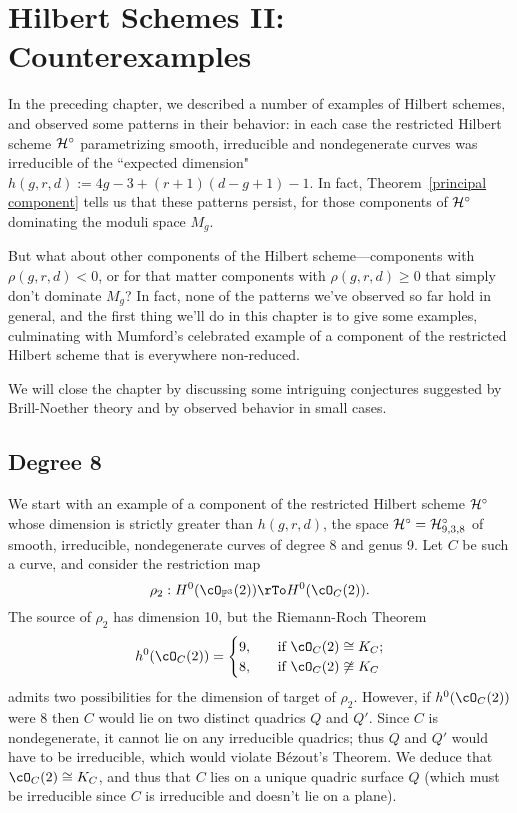 
\chapter{Hilbert Schemes II: Counterexamples} 
\label{HilbertSchemesCounterexamplesChapter}


In the preceding chapter, we described a number of examples of Hilbert schemes, and observed some patterns in their behavior: in each case the restricted Hilbert scheme $\cH^\circ$ parametrizing smooth, irreducible and nondegenerate curves was irreducible of the ``expected dimension" $h(g,r,d) :=  4g-3 + (r+1)(d-g+1) - 1$. In fact, Theorem~\ref{principal component} tells us that these patterns persist, for those components of $\cH^\circ$ dominating the moduli space $M_g$.

But what about other components of the Hilbert scheme---components with $\rho(g,r,d) < 0$, or for that matter components with $\rho(g,r,d) \geq 0$ that simply don't dominate $M_g$? In fact, none of the patterns we've observed so far hold in general, and the first thing we'll do in this chapter is to give some examples, culminating with Mumford's celebrated example of a component of the restricted Hilbert scheme that is everywhere non-reduced.

We will close the chapter by discussing some intriguing conjectures suggested by Brill-Noether theory and by observed behavior in small cases.


\section{Degree 8}\label{degree 8 section}

We start with an example of a component of the restricted Hilbert scheme $\cH^\circ$ whose dimension is strictly greater than $h(g,r,d)$, the space $\cH^\circ = \cH^\circ_{9,3,8}$ of smooth, irreducible, nondegenerate curves of degree 8 and genus 9. Let $C$ be such a curve, and consider the restriction map
$$
\rho_2 : H^0(\cO_{\PP^3}(2)) \rTo H^0(\cO_C(2)).
$$
The source of $\rho_2$ has dimension 10, but the Riemann-Roch Theorem
\begin{align*}
h^0(\cO_C(2)) =
\begin{cases}
9, \quad &\text{if } \cO_C(2) \cong K_C; \\
8,  \quad &\text{if } \cO_C(2) \not\cong K_C
\end{cases}
\end{align*}
admits two possibilities for the dimension of target of $\rho_2$.
However, if $h^0(\cO_C(2))$ were 8 then $C$ would  lie on two distinct quadrics $Q$ and $Q'$. Since $C$ is nondegenerate, it cannot lie on any irreducible quadrics; thus $Q$ and $Q'$ would have to be irreducible, which would violate B\'ezout's Theorem. We deduce that $\cO_C(2) \cong K_C$, and thus that $C$ lies on a unique quadric surface $Q$ (which must be irreducible since $C$ is irreducible and doesn't lie on a plane).


